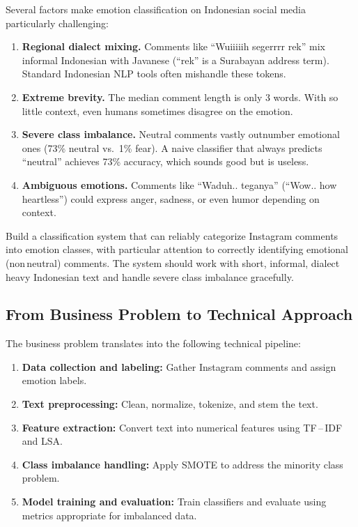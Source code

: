 \documentclass[12pt,a4paper,twoside]{article}
\theoremstyle{definition}
\begin{document}
Several factors make emotion classification on Indonesian social media particularly challenging:

\begin{enumerate}[leftmargin=2em]
    \item \textbf{Regional dialect mixing.} Comments like ``Wuiiiiih segerrrr rek'' mix informal Indonesian with Javanese (``rek'' is a Surabayan address term). Standard Indonesian NLP tools often mishandle these tokens.

    \item \textbf{Extreme brevity.} The median comment length is only 3 words. With so little context, even humans sometimes disagree on the emotion.

    \item \textbf{Severe class imbalance.} Neutral comments vastly outnumber emotional ones (73\% neutral vs.\ 1\% fear). A naive classifier that always predicts ``neutral'' achieves 73\% accuracy, which sounds good but is useless.

    \item \textbf{Ambiguous emotions.} Comments like ``Waduh.. teganya'' (``Wow.. how heartless'') could express anger, sadness, or even humor depending on context.
\end{enumerate}

\begin{notebox}
Build a classification system that can reliably categorize Instagram comments into emotion classes, with particular attention to correctly identifying emotional (non\,neutral) comments. The system should work with short, informal, dialect\,heavy Indonesian text and handle severe class imbalance gracefully.
\end{notebox}

\subsection{From Business Problem to Technical Approach}

The business problem translates into the following technical pipeline:

\begin{enumerate}[leftmargin=2em]
    \item \textbf{Data collection and labeling:} Gather Instagram comments and assign emotion labels.
    \item \textbf{Text preprocessing:} Clean, normalize, tokenize, and stem the text.
    \item \textbf{Feature extraction:} Convert text into numerical features using TF\,--\,IDF and LSA.
    \item \textbf{Class imbalance handling:} Apply SMOTE to address the minority class problem.
    \item \textbf{Model training and evaluation:} Train classifiers and evaluate using metrics appropriate for imbalanced data.
\end{enumerate}
\end{document}
